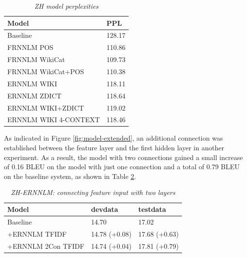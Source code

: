 \documentclass[a4paper]{article}
\begin{document}
\begin{table}
  \caption{\it ZH model perplexities}
  \vspace{2mm}
  \centering
  \begin{tabular}{ ll}
  	\hline
  	Model                 & PPL    \\ \hline\hline
  	Baseline              & 128.17 \\ \hline
  	FRNNLM POS            & 110.86 \\
  	FRNNLM WikiCat        & 109.73 \\
  	FRNNLM WikiCat+POS    & 110.38 \\ \hline
  	ERNNLM WIKI           & 118.11 \\
  	ERNNLM ZDICT          & 118.64 \\
  	ERNNLM WIKI+ZDICT     & 119.02 \\
  	ERNNLM WIKI 4-CONTEXT & 118.46 \\ \hline
  \end{tabular}
  \label{tb:PPL}
\end{table}


As indicated in Figure \ref{fig:model-extended}, an additional connection was established between the feature layer and the first hidden layer in another experiment. As a result, the model with two connections gained a small increase of 0.16 BLEU on the model with just one connection and a total of 0.79 BLEU on the baseline system, as shown in Table \ref{tb:zh-extended-both}.


\begin{table}
\caption{\it ZH-ERNNLM: connecting feature input with two layers}
\vspace{2mm}
\centering
  \begin{tabular}{lll}
  	\hline
  	Model              & devdata       & testdata      \\ \hline\hline
  	Baseline           & 14.70         & 17.02         \\ \hline
  	+ERNNLM TFIDF      & 14.78 (+0.08) & 17.68 (+0.63) \\
  	+ERNNLM 2Con TFIDF & 14.74 (+0.04) & 17.81 (+0.79)
  \end{tabular}
  \label{tb:zh-extended-both}
\end{table}
\end{document}
